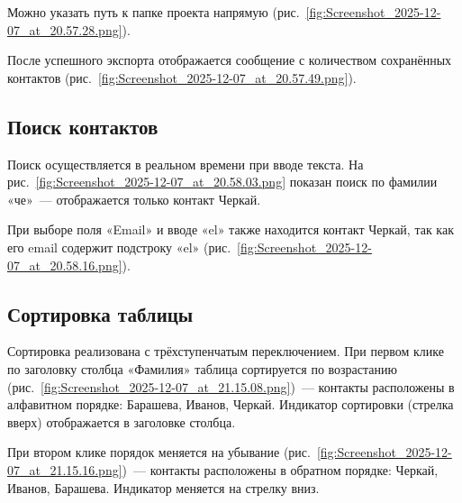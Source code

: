 
Можно указать путь к папке проекта напрямую (рис.~\ref{fig:Screenshot_2025-12-07_at_20.57.28.png}).


После успешного экспорта отображается сообщение с количеством сохранённых контактов (рис.~\ref{fig:Screenshot_2025-12-07_at_20.57.49.png}).


\subsection{Поиск контактов}

Поиск осуществляется в реальном времени при вводе текста. На рис.~\ref{fig:Screenshot_2025-12-07_at_20.58.03.png} показан поиск по фамилии «че»~--- отображается только контакт Черкай.


При выборе поля «Email» и вводе «el» также находится контакт Черкай, так как его email содержит подстроку «el» (рис.~\ref{fig:Screenshot_2025-12-07_at_20.58.16.png}).


\subsection{Сортировка таблицы}

Сортировка реализована с трёхступенчатым переключением. При первом клике по заголовку столбца «Фамилия» таблица сортируется по возрастанию (рис.~\ref{fig:Screenshot_2025-12-07_at_21.15.08.png})~--- контакты расположены в алфавитном порядке: Барашева, Иванов, Черкай. Индикатор сортировки (стрелка вверх) отображается в заголовке столбца.


При втором клике порядок меняется на убывание (рис.~\ref{fig:Screenshot_2025-12-07_at_21.15.16.png})~--- контакты расположены в обратном порядке: Черкай, Иванов, Барашева. Индикатор меняется на стрелку вниз.


